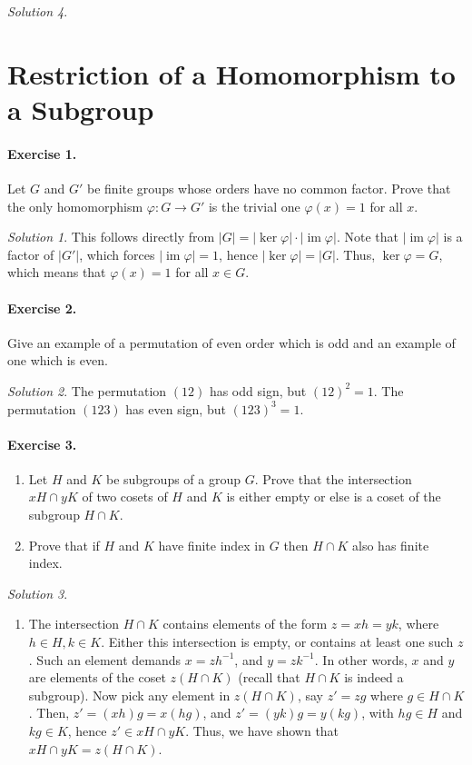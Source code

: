 \documentclass[11pt]{report}
\DeclareMathOperator\im{im}
\theoremstyle{remark}
\newtheorem*{solution}{Solution}
\begin{document}
\begin{solution}
    \section{Restriction of a Homomorphism to a Subgroup}

    \paragraph{Exercise 1.} Let $G$ and $G'$ be finite groups whose orders have no
    common factor. Prove that the only homomorphism $\varphi\colon G \to G'$ is the
    trivial one $\varphi(x) = 1$ for all $x$.
    \begin{solution}
        This follows directly from $|G| = |\ker{\varphi}|\cdot|\im{\varphi}|$. Note
        that $|\im{\varphi}|$ is a factor of $|G'|$, which forces $|\im{\varphi}| =
        1$, hence $|\ker{\varphi}| = |G|$. Thus, $\ker{\varphi} = G$, which means
        that $\varphi(x) = 1$ for all $x \in G$.
    \end{solution}

    \paragraph{Exercise 2.} Give an example of a permutation of even order which is
    odd and an example of one which is even.
    \begin{solution}
        The permutation $(12)$ has odd sign, but $(12)^2 = 1$.
        The permutation $(123)$ has even sign, but $(123)^3 = 1$.
    \end{solution}

    \paragraph{Exercise 3.} \mbox{}
    \begin{enumerate}
        \itemsep0em
        \item Let $H$ and $K$ be subgroups of a group $G$. Prove that the
        intersection $xH \cap yK$ of two cosets of $H$ and $K$ is either empty or
        else is a coset of the subgroup $H \cap K$.
        \item Prove that if $H$ and $K$ have finite index in $G$ then $H \cap K$
        also has finite index.
    \end{enumerate}
    \begin{solution} \mbox{}
    \begin{enumerate}
        \item The intersection $H \cap K$ contains elements of the form $z = xh =
        yk$, where $h \in H, k \in K$. Either this intersection is empty, or
        contains at least one such $z$. Such an element demands $x = zh^{-1}$, and
        $y = zk^{-1}$. In other words, $x$ and $y$ are elements of the coset
        $z(H\cap K)$ (recall that $H \cap K$ is indeed a subgroup). Now pick any
        element in $z(H \cap K)$, say $z' = zg$ where $g \in H \cap K$. Then, $z' =
        (xh)g = x(hg)$, and $z' = (yk)g = y(kg)$, with $hg \in H$ and $kg \in K$,
        hence $z' \in xH \cap yK$. Thus, we have shown that $xH \cap yK = z(H \cap
        K)$.


\end{enumerate}
\end{solution}
\end{solution}
\end{document}
